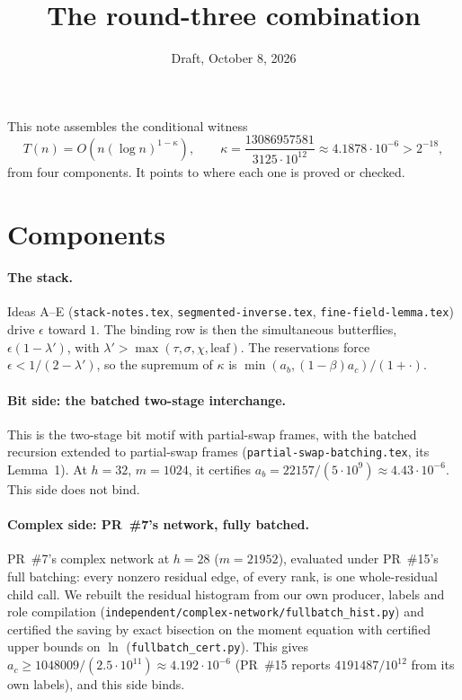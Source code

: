 \documentclass[11pt]{article}
\title{The round-three combination}
\date{Draft, October 8, 2026}
\theoremstyle{remark}\newtheorem*{remark}{Remark}
\begin{document}
\maketitle

This note assembles the conditional witness
\[
 T(n)=O\!\left(n(\log n)^{1-\kappa}\right),\qquad \kappa=\frac{13086957581}{3125\cdot10^{12}}\approx4.1878\cdot10^{-6}>2^{-18},
\]
from four components. It points to where each one is proved or checked.

\section{Components}

\paragraph{The stack.} Ideas A--E (\texttt{stack-notes.tex}, \texttt{segmented-inverse.tex},
\texttt{fine-field-lemma.tex}) drive $\epsilon$ toward $1$. The binding row is then the simultaneous
butterflies, $\epsilon(1-\lambda')$, with $\lambda'>\max(\tau,\sigma,\chi,\text{leaf})$. The reservations force
$\epsilon<1/(2-\lambda')$, so the supremum of $\kappa$ is $\min(a_b,(1-\beta)a_c)/(1+\cdot)$.

\paragraph{Bit side: the batched two-stage interchange.} This is the two-stage bit motif with partial-swap
frames, with the batched recursion extended to partial-swap frames (\texttt{partial-swap-batching.tex},
its Lemma~1). At $h=32$, $m=1024$, it certifies $a_b=22157/(5\cdot10^9)\approx4.43\cdot10^{-6}$.
This side does not bind.

\paragraph{Complex side: PR~\#7's network, fully batched.} PR~\#7's complex network at $h=28$
($m=21952$), evaluated under PR~\#15's full batching: every nonzero residual edge, of every rank, is one
whole-residual child call. We rebuilt the residual histogram from our own producer, labels and role
compilation (\texttt{independent/complex-network/fullbatch\_hist.py}) and certified the saving by exact
bisection on the moment equation with certified upper bounds on $\ln$
(\texttt{fullbatch\_cert.py}). This gives $a_c\ge1048009/(2.5\cdot10^{11})\approx4.192\cdot10^{-6}$ (PR~\#15 reports
$4191487/10^{12}$ from its own labels), and this side binds.
\end{document}
